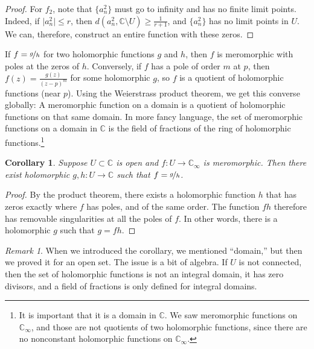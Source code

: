 \documentclass[12pt,openany]{book}
\newcommand{\sabs}[1]{\lvert {#1} \rvert}
\newcommand{\C}{{\mathbb{C}}}
\newcommand{\myquote}[1]{``#1''}
\theoremstyle{plain}
\newtheorem{cor}[thm]{Corollary}
\theoremstyle{remark}
\newtheorem{remark}[thm]{Remark}
\theoremstyle{definition}
\theoremstyle{exercise}
\theoremstyle{example}
\begin{document}
\begin{proof}
For $f_2$, note that $\{a^2_n\}$ must go to infinity and has no finite limit
points.  Indeed, if $\sabs{a^2_n} \leq r$, then $d(a^2_n,\C\setminus U)
\geq \frac{1}{r+1}$, and $\{ a^2_n \}$ has no limit points in
$U$.
We can, therefore, construct an entire function with
these zeros.
\end{proof}

If $f = \nicefrac{g}{h}$ for two holomorphic functions $g$ and $h$, then $f$
is meromorphic with poles at the zeros of $h$.  Conversely,
if $f$ has a pole of order $m$ at $p$, then $f(z) = \frac{g(z)}{{(z-p)}^m}$
for some holomorphic $g$, so $f$ is a quotient of holomorphic functions
(near $p$).
Using the Weierstrass product theorem, we get this converse globally:
A meromorphic function on a domain is a quotient of holomorphic functions on
that same domain.
In more fancy language, the set of meromorphic functions on a
domain in $\C$ is the field of fractions of the ring of holomorphic
functions.\footnote{It is important that it is a
domain in $\C$.  We saw meromorphic functions on $\C_\infty$,
and those are not quotients of two holomorphic functions, since there are
no nonconstant holomorphic functions on $\C_\infty$.}

\begin{cor}
Suppose $U \subset \C$ is open and $f \colon U \to \C_{\infty}$ is
meromorphic.  Then there exist holomorphic $g,h \colon U \to \C$ such that
$f = \nicefrac{g}{h}$.
\end{cor}

\begin{proof}
By the product theorem, there exists a holomorphic function $h$ that has
zeros exactly where $f$ has poles, and of the same order.  The function $fh$
therefore has removable singularities at all the poles of $f$.  In other
words, there is a holomorphic $g$ such that $g=fh$.
\end{proof}

\begin{remark}
When we introduced the corollary, we mentioned \myquote{domain,} but then we proved it
for an open set.  The issue is a bit of algebra.  If $U$ is not connected,
then the set of holomorphic functions is not an integral domain, it has zero
divisors, and a field of fractions is only defined for integral domains.
\end{remark}
\end{document}
